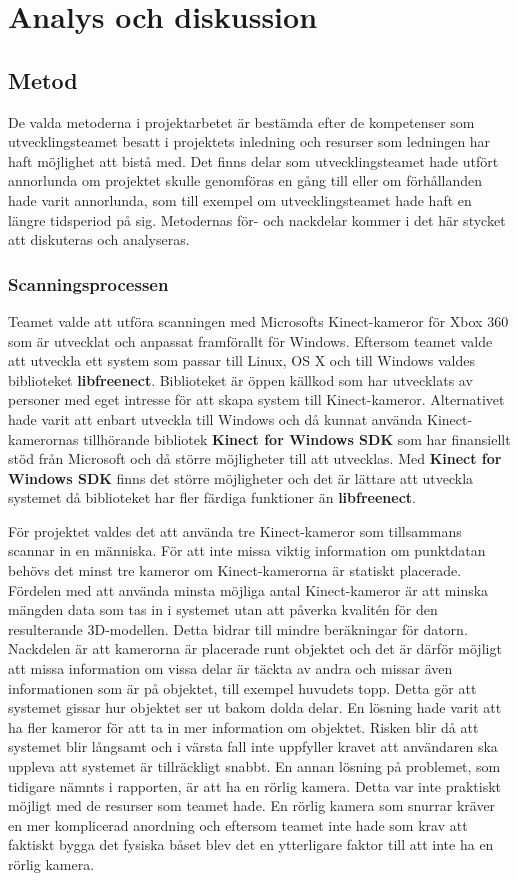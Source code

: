 \documentclass[a4paper,12pt,oneside,final]{extbook}
\begin{document}
\chapter{Analys och diskussion}
\section{Metod}
De valda metoderna i projektarbetet är bestämda efter de kompetenser som utvecklingsteamet besatt i projektets inledning och resurser som ledningen har haft möjlighet att bistå med. Det finns delar som utvecklingsteamet hade utfört annorlunda om projektet skulle genomföras en gång till eller om förhållanden hade varit annorlunda, som till exempel om utvecklingsteamet hade haft en längre tidsperiod på sig. Metodernas för- och nackdelar kommer i det här stycket att diskuteras och analyseras.

\subsection{Scanningsprocessen}

Teamet valde att utföra scanningen med Microsofts Kinect-kameror för Xbox 360 som är utvecklat och anpassat framförallt för Windows. Eftersom teamet valde att utveckla ett system som passar till Linux, OS X och till Windows valdes biblioteket \textbf{libfreenect}. Biblioteket är öppen källkod som har utvecklats av personer med eget intresse för att skapa system till Kinect-kameror. Alternativet hade varit att enbart utveckla till Windows och då kunnat använda Kinect-kamerornas tillhörande bibliotek \textbf{Kinect for Windows SDK} som har finansiellt stöd från Microsoft och då större möjligheter till att utvecklas. Med \textbf{Kinect for Windows SDK} finns det större möjligheter och det är lättare att utveckla systemet då biblioteket har fler färdiga funktioner än \textbf{libfreenect}.

För projektet valdes det att använda tre Kinect-kameror som tillsammans scannar in en människa. För att inte missa viktig information om punktdatan behövs det minst tre kameror om Kinect-kamerorna är statiskt placerade. Fördelen med att använda minsta möjliga antal Kinect-kameror är att minska mängden data som tas in i systemet utan att påverka kvalitén för den resulterande 3D-modellen. Detta bidrar till mindre beräkningar för datorn. Nackdelen är att kamerorna är placerade runt objektet och det är därför möjligt att missa information om vissa delar är täckta av andra och missar även informationen som är på objektet, till exempel huvudets topp. Detta gör att systemet gissar hur objektet ser ut bakom dolda delar. En lösning hade varit att ha fler kameror för att ta in mer information om objektet. Risken blir då att systemet blir långsamt och i värsta fall inte uppfyller kravet att användaren ska uppleva att systemet är tillräckligt snabbt. En annan lösning på problemet, som tidigare nämnts i rapporten, är att ha en rörlig kamera. Detta var inte praktiskt möjligt med de resurser som teamet hade. En rörlig kamera som snurrar kräver en mer komplicerad anordning och eftersom teamet inte hade som krav att faktiskt bygga det fysiska båset blev det en ytterligare faktor till att inte ha en rörlig kamera.
\end{document}
